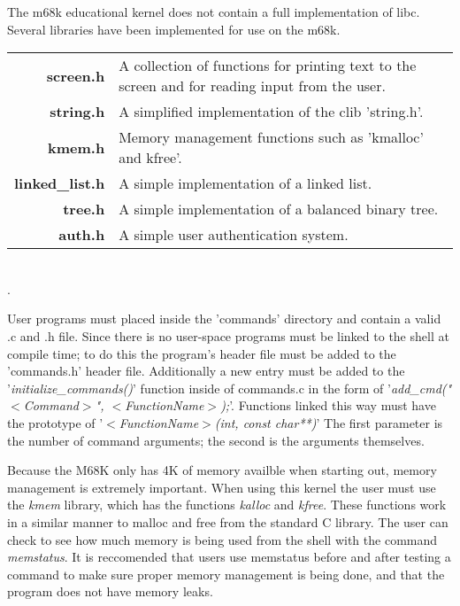 \documentclass{article}
\begin{document}

The m68k educational kernel does not contain a full implementation of libc. Several libraries have been implemented for use on the m68k.\\

\begin{tabulary}{\textwidth}{r L}
\bf{screen.h} & A collection of functions for printing text to the screen and for reading input from the user.\\
\bf{string.h} & A simplified implementation of the clib 'string.h'.\\
\bf{kmem.h} & Memory management functions such as 'kmalloc' and kfree'.\\
\bf{linked\_list.h} & A simple implementation of a linked list.\\
\bf{tree.h} & A simple implementation of a balanced binary tree.\\
\bf{auth.h} & A simple user authentication system.\\
\end{tabulary}\\
{\tiny.}\\


User programs must placed inside the 'commands' directory and contain a valid .c and .h file. Since there is no user-space programs must be linked to the shell at compile time; to do this the program's header file must be added to the 'commands.h' header file. Additionally a new entry must be added to the '\emph{initialize\_commands()}' function inside of commands.c in the form of '\emph{add\_cmd("$<$Command$>$",  $<$FunctionName$>$);}'. Functions linked this way must have the prototype of '\emph{$<$FunctionName$>$(int, const char**)}' The first parameter is the number of command arguments; the second is the arguments themselves.\\


Because the M68K only has 4K of memory availble when starting out, memory management is extremely important. When using this kernel the user must use the \emph{kmem} library, which has the functions \emph{kalloc} and \emph{kfree}. These functions work in a similar manner to malloc and free from the standard C library. The user can check to see how much memory is being used from the shell with the command \emph{memstatus}. It is reccomended that users use memstatus before and after testing a command to make sure proper memory management is being done, and that the program does not have memory leaks.\\
\end{document}

